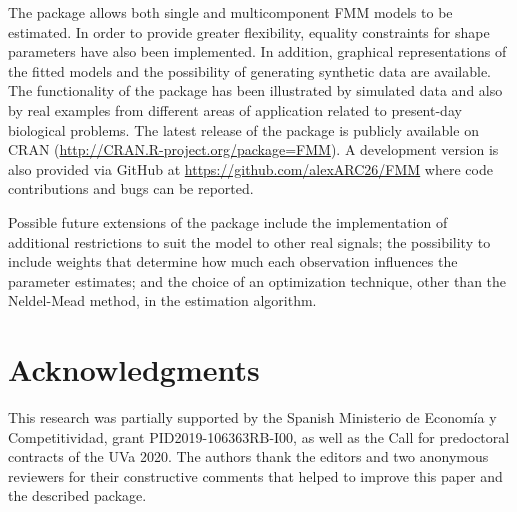 The package allows both single and multicomponent FMM models to be estimated. In order to provide greater flexibility, equality constraints for shape parameters have also been implemented. In addition, graphical representations of the fitted models and the possibility of generating synthetic data are available. The functionality of the package has been illustrated by simulated data and also by real examples from different areas of application related to present-day biological problems. 
The latest release of the  package is publicly available on CRAN (\url{http://CRAN.R-project.org/package=FMM}). A development version is also provided via GitHub at \url{https://github.com/alexARC26/FMM} where code contributions and bugs can be reported.

Possible future extensions of the  package include the implementation of additional restrictions to suit the model to other real signals; the possibility to include weights that determine how much each observation influences the parameter estimates; and the choice of an optimization technique, other than the Neldel-Mead method, in the estimation algorithm.

\section{Acknowledgments}
This research was partially supported by the Spanish Ministerio de Econom\'ia y Competitividad, grant PID2019-106363RB-I00, as well as the Call for predoctoral contracts of the UVa 2020. 
The authors thank the editors and two anonymous reviewers for their constructive comments that helped to improve this paper and the described package.



\address{Itziar Fern\'andez\\
  Department of Statistics and Operations Research\\
  Universidad de Valladolid\\
  Valladolid, Spain\\
  ORCiD: 0000-0002-5077-4448\\
  }

\address{Alejandro Rodr\'iguez-Collado\\
  Department of Statistics and Operations Research\\
  Universidad de Valladolid\\
  Valladolid, Spain\\
  ORCiD: 0000-0001-5450-9580\\
  }

